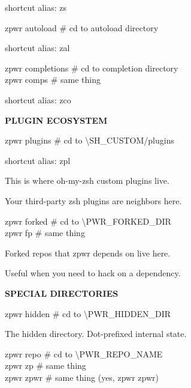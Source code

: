 \documentclass[11pt,a4paper,twoside]{book}
\begin{document}
shortcut alias: zs

\begin{codebox}
zpwr autoload      \# cd to autoload directory\\
\end{codebox}

shortcut alias: zal

\begin{codebox}
zpwr completions   \# cd to completion directory\\
zpwr comps         \# same thing\\
\end{codebox}

shortcut alias: zco


\vspace{12pt}
{\bfseries\color{neonyellow} PLUGIN ECOSYSTEM}\vspace{4pt}

\begin{codebox}
zpwr plugins       \# cd to \textbackslash{}SH\_CUSTOM/plugins\\
\end{codebox}

shortcut alias: zpl

This is where oh-my-zsh custom plugins live.

Your third-party zsh plugins are neighbors here.

\begin{codebox}
zpwr forked        \# cd to \textbackslash{}PWR\_FORKED\_DIR\\
zpwr fp            \# same thing\\
\end{codebox}

Forked repos that zpwr depends on live here.

Useful when you need to hack on a dependency.


\vspace{12pt}
{\bfseries\color{neonyellow} SPECIAL DIRECTORIES}\vspace{4pt}

\begin{codebox}
zpwr hidden        \# cd to \textbackslash{}PWR\_HIDDEN\_DIR\\
\end{codebox}

The hidden directory. Dot-prefixed internal state.

\begin{codebox}
zpwr repo          \# cd to \textbackslash{}PWR\_REPO\_NAME\\
zpwr zp            \# same thing\\
zpwr zpwr          \# same thing (yes, zpwr zpwr)\\
\end{codebox}
\end{document}
